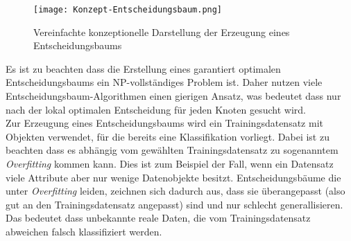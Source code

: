 \begin{figure}[htbp]
    \centering
    \texttt{[image: Konzept-Entscheidungsbaum.png]}
    \caption{Vereinfachte konzeptionelle Darstellung der Erzeugung eines Entscheidungsbaums \autocite{SebastianManteyPruning:online}}
\end{figure}

Es ist zu beachten dass die Erstellung eines garantiert optimalen Entscheidungsbaums ein NP-vollständiges Problem ist. \autocite{NPComplete} Daher nutzen viele Entscheidungsbaum-Algorithmen einen gierigen Ansatz, was bedeutet dass nur nach der lokal optimalen Entscheidung für jeden Knoten gesucht wird. \autocite{DataMining}\\

Zur Erzeugung eines Entscheidungsbaums wird ein Trainingsdatensatz mit Objekten verwendet, für die bereits eine Klassifikation vorliegt. \autocite{Entschei47:online} Dabei ist zu beachten dass es abhängig vom gewählten Trainingsdatensatz zu sogenanntem \textit{Overfitting} kommen kann. Dies ist zum Beispiel der Fall, wenn ein Datensatz viele Attribute aber nur wenige Datenobjekte besitzt. \autocite{PythonCourseDecisionTrees:online} Entscheidungsbäume die unter \textit{Overfitting} leiden, zeichnen sich dadurch aus, dass sie überangepasst (also gut an den Trainingsdatensatz angepasst) sind und nur schlecht generallisieren. Das bedeutet dass unbekannte reale Daten, die vom Trainingsdatensatz abweichen falsch klassifiziert werden. \autocite{DataMining}